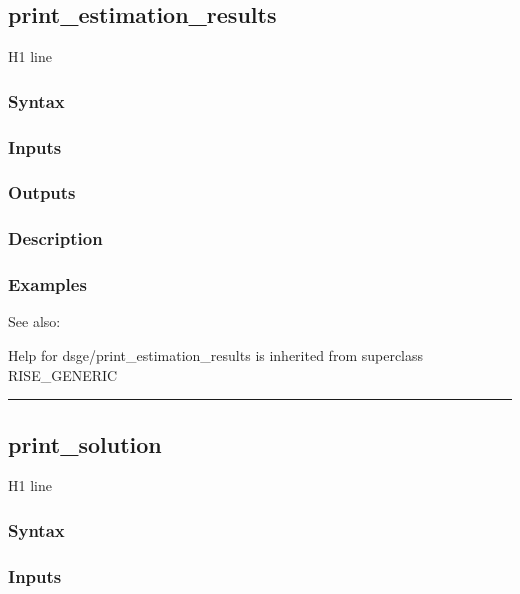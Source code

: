 \documentclass[letterpaper,10pt,english]{sphinxmanual}
\begin{document}
\subsection{print\_estimation\_results}
\label{classes/models/@dsge/dsge:print-estimation-results}\label{classes/models/@dsge/dsge:id120}
H1 line


\subsubsection{Syntax}
\label{classes/models/@dsge/dsge:id121}

\subsubsection{Inputs}
\label{classes/models/@dsge/dsge:id122}

\subsubsection{Outputs}
\label{classes/models/@dsge/dsge:id123}

\subsubsection{Description}
\label{classes/models/@dsge/dsge:id124}

\subsubsection{Examples}
\label{classes/models/@dsge/dsge:id125}
See also:

Help for dsge/print\_estimation\_results is inherited from superclass RISE\_GENERIC


\bigskip\hrule{}\bigskip



\subsection{print\_solution}
\label{classes/models/@dsge/dsge:print-solution}\label{classes/models/@dsge/dsge:id126}
H1 line


\subsubsection{Syntax}
\label{classes/models/@dsge/dsge:id127}

\subsubsection{Inputs}
\label{classes/models/@dsge/dsge:id128}
\end{document}
